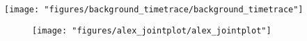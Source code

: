 \begin{figure*}
\begin{center}
\texttt{[image: "figures/background\_timetrace/background\_timetrace"]}
\caption[]{}
\end{center}
\end{figure*}





\begin{figure}
\begin{center}
\texttt{[image: "figures/alex\_jointplot/alex\_jointplot"]}
\caption[]{}
\end{center}
\end{figure}










